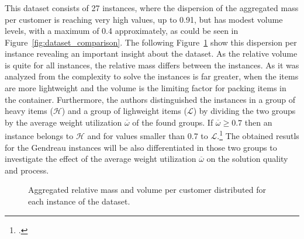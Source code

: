 \subsubsection{\gendreauDataSetText}

This dataset consists of 27 instances, where the dispersion of the aggregated mass per customer is reaching very high values, up to
0.91, but has modest volume levels, with a maximum of 0.4 approximately, as could be seen in Figure~\ref{fig:dataset_comparison}. The
following Figure~\ref{fig:aggregated_gendreau_plots} show this dispersion per instance revealing an important insight about the dataset.
As the relative volume is quite for all instances, the relative mass differs between the instances. As it was analyzed from \cite{tamke_branch-and-cut_2024}
the complexity to solve the instances is far greater, when the items are more lightweight and the volume is the limiting factor
for packing items in the container. Furthermore, the authors distinguished the instances in a group of heavy items ($\mathcal{H}$) and
a group of lighweight items ($\mathcal{L}$) by dividing the two groups by the average weight utilization $\overline{\omega}$ of the found
groups. If $\overline{\omega} \geq 0.7$ then an instance belongs to $\mathcal{H}$ and for values smaller than 0.7 to $\mathcal{L}$.\footcite[cf.][pp. 23-25]{tamke_branch-and-cut_2024}
The obtained resutls for the Gendreau instances will be also differentiated in those two groups to investigate the effect of
the average weight utilization $\overline{\omega}$ on the solution quality and process.

\begin{figure}[ht]
  \centering
  \caption{Aggregated relative mass and volume per customer distributed for each instance of the \gendreauDataSetText dataset.}
  \label{fig:aggregated_gendreau_plots}
\end{figure}

